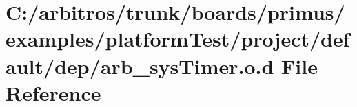 \hypertarget{platform_test_2project_2default_2dep_2arb__sys_timer_8o_8d}{\section{C\-:/arbitros/trunk/boards/primus/examples/platform\-Test/project/default/dep/arb\-\_\-sys\-Timer.o.\-d File Reference}
\label{platform_test_2project_2default_2dep_2arb__sys_timer_8o_8d}
}
